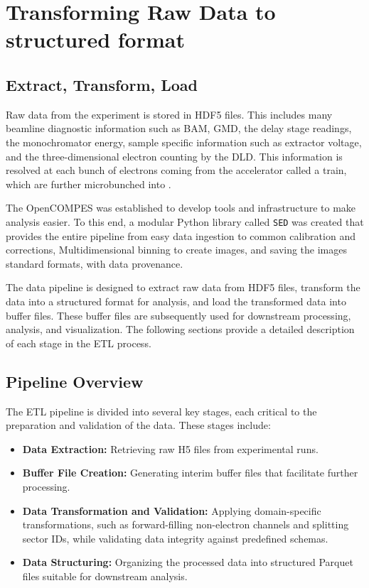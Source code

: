 \chapter{Transforming Raw Data to structured format}
\section*{Extract, Transform, Load}
Raw data from the experiment is stored in \gls{HDF5} files. This includes many \gls{beamline} diagnostic information such as \gls{BAM}, \gls{GMD}, the delay stage readings, the monochromator energy, sample specific information such as extractor voltage, and the three-dimensional electron counting by the \gls{DLD}. This information is resolved at each bunch of electrons coming from the accelerator called a \gls{train}, which are further microbunched into .

The \gls{OpenCOMPES} was established to develop tools and infrastructure to make analysis easier. To this end, a modular Python library called \texttt{\gls{SED}} was created that provides the entire pipeline from easy data ingestion to common calibration and corrections, Multidimensional binning to create images, and saving the images standard formats, with data provenance.



The data pipeline is designed to extract raw data from \gls{HDF5} files, transform the data into a structured format for analysis, and load the transformed data into buffer files. These buffer files are subsequently used for downstream processing, analysis, and visualization. The following sections provide a detailed description of each stage in the ETL process.    


\section*{Pipeline Overview}
The ETL pipeline is divided into several key stages, each critical to the preparation and validation of the data. These stages include:

\begin{itemize}
    \item \textbf{Data Extraction:} Retrieving raw H5 files from experimental runs.
    \item \textbf{Buffer File Creation:} Generating interim buffer files that facilitate further processing.
    \item \textbf{Data Transformation and Validation:} Applying domain-specific transformations, such as forward-filling non-electron channels and splitting sector IDs, while validating data integrity against predefined schemas.
    \item \textbf{Data Structuring:} Organizing the processed data into structured Parquet files suitable for downstream analysis.
\end{itemize}

